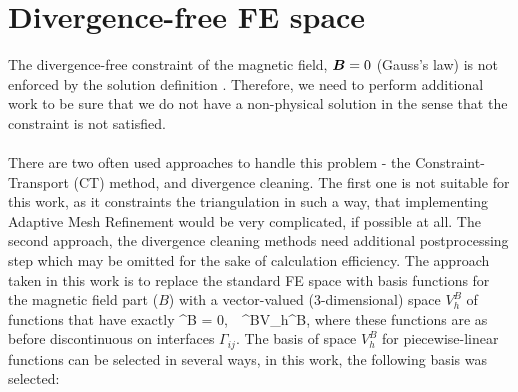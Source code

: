 \section{Divergence-free FE space}
The divergence-free constraint of the magnetic field, $\mbox{\boldmath $B$} = 0$ (Gauss's law) is not enforced by the solution definition . Therefore, we need to perform additional work to be sure that we do not have a non-physical solution in the sense that the constraint is not satisfied.
\paragraph{}
There are two often used approaches to handle this problem - the Constraint-Transport (CT) method, and divergence cleaning. The first one is not suitable for this work, as it constraints the triangulation in such a way, that implementing Adaptive Mesh Refinement would be very complicated, if possible at all. The second approach, the divergence cleaning methods need additional postprocessing step which may be omitted for the sake of calculation efficiency. The approach taken in this work is to replace the standard FE space   with basis functions  for the magnetic field part ($B$) with a vector-valued (3-dimensional) space $V_h^B$ of functions that have exactly
\be
\nabla \cdot \mrvh^B = 0,\ \ \mrvh^B\in V_h^B,
\ee
where these functions are as before discontinuous on interfaces $\Gamma_{ij}$.
The basis of space $V_h^B$ for piecewise-linear functions can be selected in several ways, in this work, the following basis was selected:
